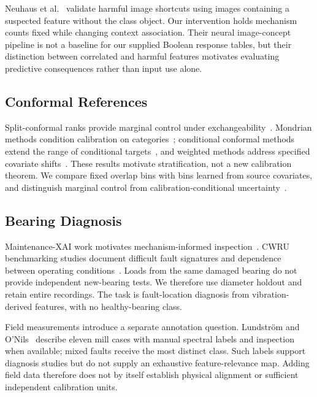 \documentclass[conference]{IEEEtran}
\begin{document}
Neuhaus et al.~\cite{neuhaus2023spurious} validate harmful image shortcuts using images containing a suspected feature without the class object. Our intervention holds mechanism counts fixed while changing context association. Their neural image-concept pipeline is not a baseline for our supplied Boolean response tables, but their distinction between correlated and harmful features motivates evaluating predictive consequences rather than input use alone.

\subsection{Conformal References}
Split-conformal ranks provide marginal control under exchangeability~\cite{angelopoulos2023conformal}. Mondrian methods condition calibration on categories~\cite{vovk2005algorithmic,vovk2012conditional}; conditional conformal methods extend the range of conditional targets~\cite{gibbs2025conditional}, and weighted methods address specified covariate shifts~\cite{tibshirani2019shift}. These results motivate stratification, not a new calibration theorem. We compare fixed overlap bins with bins learned from source covariates, and distinguish marginal control from calibration-conditional uncertainty~\cite{vovk2012conditional,bates2023outliers}.

\subsection{Bearing Diagnosis}
Maintenance-XAI work motivates mechanism-informed inspection~\cite{matzka2020explainable,vollert2021interpretable}. CWRU benchmarking studies document difficult fault signatures and dependence between operating conditions~\cite{smith2015cwru,hendriks2022benchmarking}. Loads from the same damaged bearing do not provide independent new-bearing tests. We therefore use diameter holdout and retain entire recordings. The task is fault-location diagnosis from vibration-derived features, with no healthy-bearing class.

Field measurements introduce a separate annotation question. Lundstr\"om and O'Nils~\cite{lundstrom2023factory} describe eleven mill cases with manual spectral labels and inspection when available; mixed faults receive the most distinct class. Such labels support diagnosis studies but do not supply an exhaustive feature-relevance map. Adding field data therefore does not by itself establish physical alignment or sufficient independent calibration units.
\end{document}
